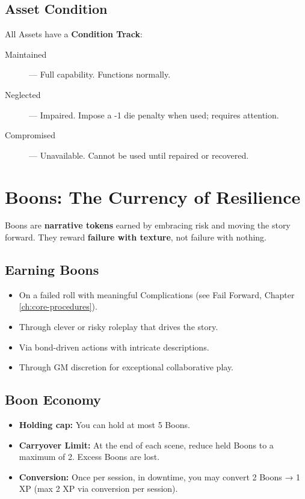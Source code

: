 \subsection*{Asset Condition}

All Assets have a \textbf{Condition Track}:

\begin{description}
    \item[Maintained] --- Full capability. Functions normally.
    \item[Neglected] --- Impaired. Impose a -1 die penalty when used; requires attention.
    \item[Compromised] --- Unavailable. Cannot be used until repaired or recovered.
\end{description}

\section*{Boons: The Currency of Resilience}

Boons are \textbf{narrative tokens} earned by embracing risk and moving the story forward. They reward \textbf{failure with texture}, not failure with nothing.

\subsection*{Earning Boons}

\begin{itemize}
    \item On a failed roll with meaningful Complications (see Fail Forward, Chapter \ref{ch:core-procedures}).
    \item Through clever or risky roleplay that drives the story.
    \item Via bond-driven actions with intricate descriptions.
    \item Through GM discretion for exceptional collaborative play.
\end{itemize}

\subsection*{Boon Economy}

\begin{itemize}
    \item \textbf{Holding cap:} You can hold at most 5 Boons.
    \item \textbf{Carryover Limit:} At the end of each scene, reduce held Boons to a maximum of 2. Excess Boons are lost.
    \item \textbf{Conversion:} Once per session, in downtime, you may convert 2 Boons → 1 XP (max 2 XP via conversion per session).
\end{itemize}

